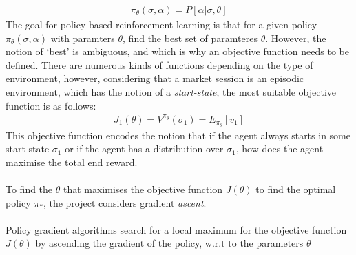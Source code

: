 \documentclass[ %
                    author={Ashwinder Khurana},
                supervisor={Prof Dave Cliff},
                    degree={MEng},
                     title={The Deeply Reinforced Trader},
                  subtitle={},
                      type={enterprise},
                      year={2020} ]{dissertation}
\begin{document}
{\begin{equation}
\label{Policy Gradient}
\begin{split}
\pi_\theta(\sigma, \alpha) = P[\alpha | \sigma, \theta]
\end{split}
\end{equation}
\noindent
The goal for policy based reinforcement learning is that for a given policy $\pi_\theta(\sigma,\alpha)$ with paramters $\theta$, find the best set of paramteres $\theta$. However, the notion of \enquote*{best} is ambiguous, and  which is why an objective function needs to be defined. There are numerous kinds of functions depending on the type of environment, however, considering that a market session is an episodic environment, which has the notion of a \textit{start-state}, the most suitable objective function is as follows: 
\begin{equation}
\label{Policy Gradient}
\begin{split}
J_1(\theta) = V^{\pi_\theta}(\sigma_1) = E_{\pi_\theta} [v_1]
\end{split}
\end{equation}
\noindent
This objective function encodes the notion that if the agent always starts in some start state $\sigma_1$ or if the agent has a distribution over $\sigma_1$, how does the agent maximise the total end reward.
\\
\\
To find the $\theta$ that maximises the objective function $J(\theta)$ to find the optimal policy $\pi_*$, the project considers gradient \textit{ascent}. 
\\
\\
Policy gradient algorithms search for a local maximum for the objective function $J(\theta)$ by ascending the gradient of the policy, w.r.t to the parameters $\theta$ 

}
\end{document}
